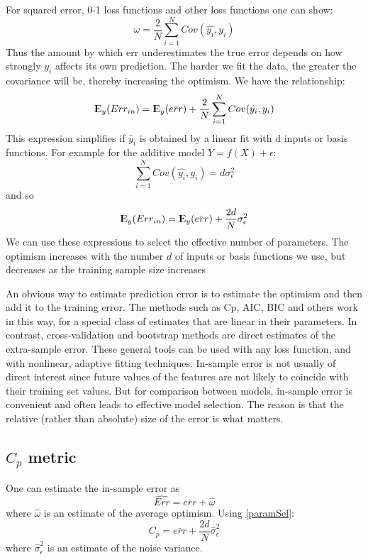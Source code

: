 \documentclass[12pt, letterpaper]{article}
\theoremstyle{definition}
\newcommand{\E}{{\rm I\kern-.3em E}}
\begin{document}
For squared error, 0-1 loss functions and other loss functions one can show:
\begin{equation}
\omega = \frac{2}{N} \sum_{i=1}^N Cov(\hat{y_i}, y_i)
\end{equation}
Thus the amount by which err underestimates the true error depends on how strongly $y_i$ affects its own prediction. The harder we fit the data, the greater the covariance will be, thereby increasing the optimism. We have the relationship:
\begin{equation}
\E_y (Err_{in}) = \E_y(\bar{err}) +\frac{2}{N} \sum_{i=1}^N Cov(\hat{y_i}, y_i)
\end{equation}
This expression simplifies if $\hat{y}_i$ is obtained by a linear fit with d inputs or basis functions. For example for the additive model $Y=f(X) + \epsilon$:
\begin{equation}
 \sum_{i=1}^N Cov(\hat{y_i}, y_i) = d\sigma_\epsilon^2
\end{equation}
and so
\begin{equation}
\E_y (Err_{in}) = \E_y(\bar{err}) +\frac{2d}{N} \sigma_\epsilon^2
\label{paramSel}
\end{equation}
We can use these expressions to select the effective number of parameters. The optimism increases with the number $d$ of inputs or basis functions we use, but decreases as the training sample size increases

An obvious way to estimate prediction error is to estimate the optimism and then add it to the training error. The methods such as Cp, AIC, BIC and others work in this way, for a special class of estimates that are linear in their parameters.
In contrast, cross-validation and bootstrap methods are direct estimates of the extra-sample error. These general tools can be used with any loss function, and with nonlinear, adaptive fitting techniques.
In-sample error is not usually of direct interest since future values of the features are not likely to coincide with their training set values. But for comparison between models, in-sample error is convenient and often leads to effective model selection. The reason is that the relative (rather than absolute) size of the error is what matters.

\subsection{$C_p$ metric}
One can estimate the in-sample error as
\begin{equation}
\hat{Err} = \bar{err}+\hat{\omega}
\end{equation}
where $\hat{\omega}$ is an estimate of the average optimism. Using \autoref{paramSel}:
\begin{equation}
C_p = \bar{err} +\frac{2d}{N} \hat{\sigma}_\epsilon^2
\end{equation}
where $\hat{\sigma}_\epsilon^2$ is an estimate of the noise variance.
\end{document}
